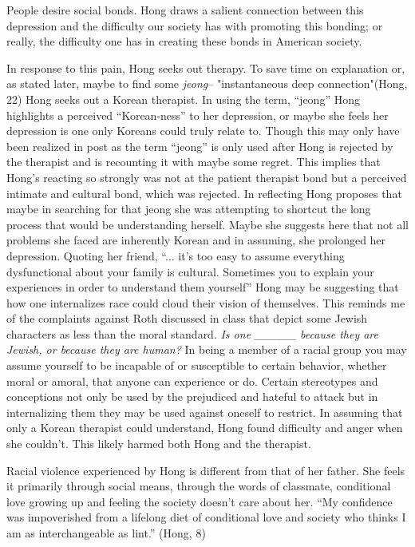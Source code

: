 \documentclass[
]{article}
\begin{document}
People desire social bonds.
Hong draws a salient connection between this depression and the difficulty our society has with promoting this bonding;
or really, the difficulty one has in creating these bonds in American society.
\par 
In response to this pain, Hong seeks out therapy.
To save time on explanation or, as stated later, maybe to find some \emph{jeong}-- "instantaneous deep connection"(Hong, 22) Hong seeks out a Korean therapist. 
In using the term, ``jeong'' Hong highlights a perceived ``Korean-ness'' to her depression, or maybe she feels her depression is one only Koreans could truly relate to.
Though this may only have been realized in post as the term ``jeong'' is only used after Hong is rejected by the therapist and is recounting it with maybe some regret.
This implies that Hong's reacting so strongly was not at the patient therapist bond but a perceived intimate and cultural bond, which was rejected.
In reflecting Hong proposes that maybe in searching for that jeong she was attempting to shortcut the long process that would be understanding herself.
Maybe she suggests here that not all problems she faced are inherently Korean and in assuming, she prolonged her depression.
Quoting her friend, ``... it's too easy to assume everything dysfunctional about your family is cultural. Sometimes you to explain your experiences in order to understand them yourself''
Hong may be suggesting that how one internalizes race could cloud their vision of themselves.
This reminds me of the complaints against Roth discussed in class that depict some Jewish characters as less than the moral standard.
\emph{Is one \_\_\_\_\_ because they are Jewish, or because they are human?}
In being a member of a racial group you may assume yourself to be incapable of or susceptible to certain behavior, whether moral or amoral, that anyone can experience or do.
Certain stereotypes and conceptions not only be used by the prejudiced and hateful to attack but in internalizing them they may be used against oneself to restrict.
In assuming that only a Korean therapist could understand, Hong found difficulty and anger when she couldn't.
This likely harmed both Hong and the therapist.
\par
Racial violence experienced by Hong is different from that of her father.
She feels it primarily through social means, through the words of classmate, conditional love growing up and feeling the society doesn't care about her.
``My confidence was impoverished from a lifelong diet of conditional love and society who thinks I am as interchangeable as lint.'' (Hong, 8)
\end{document}
